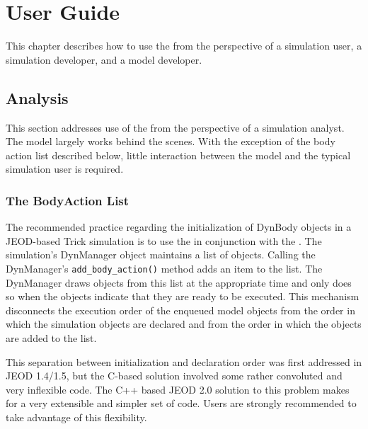 %
%

\chapter{User Guide}
\label{ch:user}
This chapter describes how to use the \ModelDesc from the
perspective of a simulation user, a simulation developer,
and a model developer.


\section{Analysis}
This section addresses use of the \ModelDesc from the perspective
of a simulation analyst. The model largely works behind the scenes.
With the exception of the body action list described below,
little interaction between the model and the typical simulation
user is required.

\subsection{The BodyAction List}\label{sec:user_analysis_body_action}

The recommended practice regarding the initialization of DynBody
objects in a JEOD-based Trick simulation is to use the
 in conjunction with the \ModelDesc.
The simulation's DynManager object maintains a list
of \ModelDesc objects. Calling the DynManager's {\tt add\_body\_action()}
method adds an item to the list. The DynManager draws objects from this list
at the appropriate time and only does so when the objects indicate
that they are ready to be executed. This mechanism disconnects the
execution order of the enqueued model objects from the order in
which the simulation objects are declared and from the order
in which the objects are added to the list.

This separation between initialization and declaration order
was first addressed in JEOD 1.4/1.5, but the C-based solution
involved some rather convoluted and very inflexible code.
The C++ based JEOD 2.0 solution to this problem makes for
a very extensible and simpler set of code. Users are strongly
recommended to take advantage of this flexibility.

